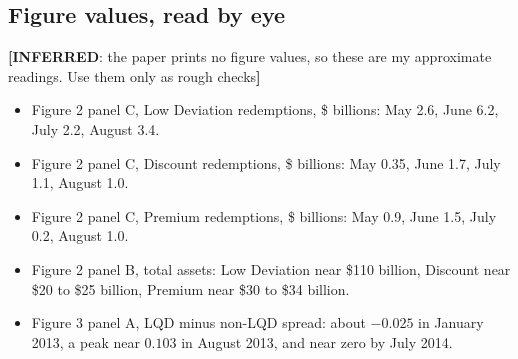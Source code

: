 \documentclass[10pt,a4paper]{article}
\newcommand{\IN}[1]{\textcolor{cin}{\textbf{[INFERRED}: #1\textbf{]}}}
\begin{document}
\subsection{Figure values, read by eye}
\IN{the paper prints no figure values, so these are my approximate readings. Use them only as rough checks}
\begin{itemize}
\item Figure 2 panel C, Low Deviation redemptions, \$ billions: May 2.6, June 6.2, July 2.2, August 3.4.
\item Figure 2 panel C, Discount redemptions, \$ billions: May 0.35, June 1.7, July 1.1, August 1.0.
\item Figure 2 panel C, Premium redemptions, \$ billions: May 0.9, June 1.5, July 0.2, August 1.0.
\item Figure 2 panel B, total assets: Low Deviation near \$110 billion, Discount near \$20 to \$25 billion, Premium near \$30 to \$34 billion.
\item Figure 3 panel A, LQD minus non-LQD spread: about $-0.025$ in January 2013, a peak near $0.103$ in August 2013, and near zero by July 2014.
\end{itemize}
\end{document}
